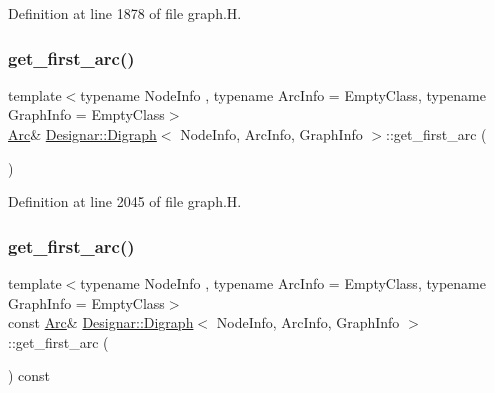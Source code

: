 Definition at line 1878 of file graph.\+H.

\mbox{\label{class_designar_1_1_digraph_af28c0708f3a09f172e4258772f56a476}} 
\subsubsection{\texorpdfstring{get\+\_\+first\+\_\+arc()}{get\_first\_arc()}\hspace{0.1cm}{\footnotesize\ttfamily [1/2]}}
{\footnotesize\ttfamily template$<$typename Node\+Info , typename Arc\+Info  = Empty\+Class, typename Graph\+Info  = Empty\+Class$>$ \\
\hyperlink{class_designar_1_1_digraph_a0ceb278671f2a535c00fddccdeafd69f}{Arc}\& \hyperlink{class_designar_1_1_digraph}{Designar\+::\+Digraph}$<$ Node\+Info, Arc\+Info, Graph\+Info $>$\+::get\+\_\+first\+\_\+arc (\begin{DoxyParamCaption}{ }\end{DoxyParamCaption})\hspace{0.3cm}{\ttfamily [inline]}}



Definition at line 2045 of file graph.\+H.

\mbox{\label{class_designar_1_1_digraph_a7842484a51df899e95a65e979d70079c}} 
\subsubsection{\texorpdfstring{get\+\_\+first\+\_\+arc()}{get\_first\_arc()}\hspace{0.1cm}{\footnotesize\ttfamily [2/2]}}
{\footnotesize\ttfamily template$<$typename Node\+Info , typename Arc\+Info  = Empty\+Class, typename Graph\+Info  = Empty\+Class$>$ \\
const \hyperlink{class_designar_1_1_digraph_a0ceb278671f2a535c00fddccdeafd69f}{Arc}\& \hyperlink{class_designar_1_1_digraph}{Designar\+::\+Digraph}$<$ Node\+Info, Arc\+Info, Graph\+Info $>$\+::get\+\_\+first\+\_\+arc (\begin{DoxyParamCaption}{ }\end{DoxyParamCaption}) const\hspace{0.3cm}{\ttfamily [inline]}}



